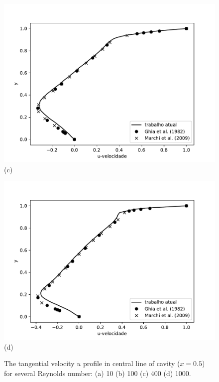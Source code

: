 \begin{center}
\begin{figure}[H]
\begin{minipage}{.5\linewidth}
      \centering
      \includegraphics[scale=0.53]{./02_chaps/cap_validation/figure/Re_400_u_profile.pdf}\\
      (c)
     \end{minipage}%
     \begin{minipage}{.5\linewidth}
      \centering
      \includegraphics[scale=0.53]{./02_chaps/cap_validation/figure/Re_1000_u_profile.pdf}\\
      (d)
     \end{minipage}
     \medskip
     \caption{The tangential velocity $u$ profile in central line of cavity ($x=0.5$) for several Reynolds number:
     (a) 10
     (b) 100
     (c) 400
     (d) 1000.}
     \label{velocity vx cavity}
\end{figure}
\end{center}

